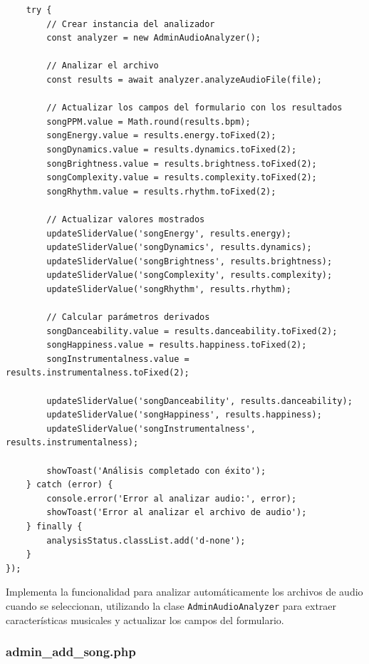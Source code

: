 \documentclass[a4paper,12pt]{article}
\begin{document}
\begin{itemize}
\begin{verbatim}
    try {
        // Crear instancia del analizador
        const analyzer = new AdminAudioAnalyzer();
        
        // Analizar el archivo
        const results = await analyzer.analyzeAudioFile(file);
        
        // Actualizar los campos del formulario con los resultados
        songPPM.value = Math.round(results.bpm);
        songEnergy.value = results.energy.toFixed(2);
        songDynamics.value = results.dynamics.toFixed(2);
        songBrightness.value = results.brightness.toFixed(2);
        songComplexity.value = results.complexity.toFixed(2);
        songRhythm.value = results.rhythm.toFixed(2);
        
        // Actualizar valores mostrados
        updateSliderValue('songEnergy', results.energy);
        updateSliderValue('songDynamics', results.dynamics);
        updateSliderValue('songBrightness', results.brightness);
        updateSliderValue('songComplexity', results.complexity);
        updateSliderValue('songRhythm', results.rhythm);
        
        // Calcular parámetros derivados
        songDanceability.value = results.danceability.toFixed(2);
        songHappiness.value = results.happiness.toFixed(2);
        songInstrumentalness.value = results.instrumentalness.toFixed(2);
        
        updateSliderValue('songDanceability', results.danceability);
        updateSliderValue('songHappiness', results.happiness);
        updateSliderValue('songInstrumentalness', results.instrumentalness);
        
        showToast('Análisis completado con éxito');
    } catch (error) {
        console.error('Error al analizar audio:', error);
        showToast('Error al analizar el archivo de audio');
    } finally {
        analysisStatus.classList.add('d-none');
    }
});
    \end{verbatim}
    Implementa la funcionalidad para analizar automáticamente los archivos de audio cuando se seleccionan, utilizando la clase \texttt{AdminAudioAnalyzer} para extraer características musicales y actualizar los campos del formulario.
\end{itemize}

\subsubsection{admin\_add\_song.php}
\end{document}
